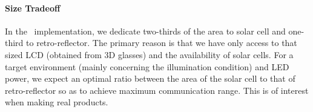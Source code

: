 

\paragraph{Size Tradeoff}
In the \vitag\ implementation, we dedicate two-thirds of the area to solar cell and one-third to retro-reflector. The primary reason is that we have only access to that sized LCD (obtained from 3D glasses) and the availability of solar cells. For a target environment (mainly concerning the illumination condition) and LED power, we expect an optimal ratio between the area of the solar cell to that of retro-reflector so as to achieve maximum communication range. This is of interest when making real products.

